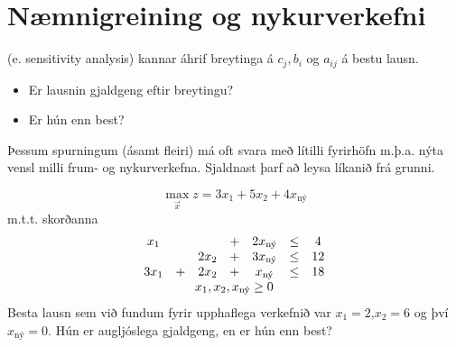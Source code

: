 \section{Næmnigreining og nykurverkefni}\label{sec:naemnigreining}
 (e. sensitivity analysis) kannar áhrif breytinga á $c_j, b_i$ og $a_{ij}$ á bestu lausn.
\begin{itemize}
 \item Er lausnin gjaldgeng eftir breytingu?
 \item Er hún enn best?
\end{itemize}
Þessum spurningum (ásamt fleiri) má oft svara með lítilli fyrirhöfn m.þ.a. nýta vensl milli frum- og  nykurverkefna. Sjaldnast þarf að leysa líkanið frá grunni.

\begin{daemi}\label{wyndor:new}
$$\max_{\vec{x}} z= 3x_1+5x_2+4x_{\textrm{ný}} $$
m.t.t. skorðanna
\[\begin{array}{ccccccc}
 x_1 &   &      &+& 2x_{\textrm{ný}} & \leq & 4 \\
     &   & 2x_2 &+& 3x_{\textrm{ný}} & \leq &12 \\
 3x_1& + & 2x_2 &+&  x_{\textrm{ný}} & \leq &18\\
\multicolumn{7}{c}{x_1,x_2,x_{\textrm{ný}}\geq0}
\end{array}\]
Besta lausn sem við fundum fyrir upphaflega verkefnið var \mbox{$x_1=2$},\mbox{$x_2=6$} og því $x_{\textrm{ný}}=0$. Hún er augljóslega gjaldgeng, en er hún enn best?
\end{daemi}
